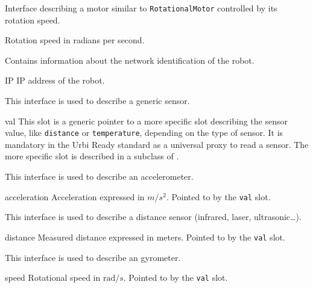 Interface describing a motor similar to \lstinline{RotationalMotor}
controlled by its rotation speed.

\begin{urbiscriptapi}
\item[speed] Rotation speed in radians per second.
\end{urbiscriptapi}


Contains information about the network identification of the robot.

\begin{urbiscriptapi}
\item[IP] IP address of the robot.
\end{urbiscriptapi}


This interface is used to describe a generic sensor.

\begin{urbiscriptapi}
\item[val] This slot is a generic pointer to a more specific slot describing
  the sensor value, like \lstinline{distance} or \lstinline{temperature},
  depending on the type of sensor. It is mandatory in the Urbi Ready
  standard as a universal proxy to read a sensor. The more specific slot is
  described in a subclass of .
\end{urbiscriptapi}


This interface is used to describe an accelerometer.

\begin{urbiscriptapi}
\item[acceleration] Acceleration expressed in $m/s^2$.  Pointed to by the
  \lstinline{val} slot.
\end{urbiscriptapi}


This interface is used to describe a distance sensor (infrared, laser,
ultrasonic\ldots).

\begin{urbiscriptapi}
\item[distance] Measured distance expressed in meters.  Pointed to by the
  \lstinline{val} slot.
\end{urbiscriptapi}


This interface is used to describe an gyrometer.

\begin{urbiscriptapi}
\item[speed] Rotational speed in $\mathrm{rad}/s$.  Pointed to by the
  \lstinline{val} slot.
\end{urbiscriptapi}


